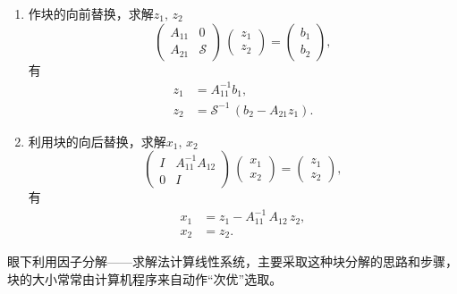 \begin{enumerate}
  \item 作块的向前替换，求解$z_{1}, \, z_{2}$
  \begin{equation*}
    \begin{pmatrix}
    A_{11} & 0 \\
    A_{21} & \mathcal{S}
    \end{pmatrix}
    \,
    \begin{pmatrix}
      z_{1} \\
      z_{2}
    \end{pmatrix}
    =
    \begin{pmatrix}
      b_{1} \\
      b_{2}
    \end{pmatrix},
  \end{equation*}
  有
  \begin{equation*}
    \begin{split}
      z_{1} & = A_{11}^{-1} b_{1}, \\
      z_{2} & = \mathcal{S}^{-1} \, \left( b_{2} - A_{21} z_{1} \right).
    \end{split}
  \end{equation*}
  \item 利用块的向后替换，求解$x_{1}, \, x_{2}$
  \begin{equation*}
    \begin{pmatrix}
      I & A_{11}^{-1} A_{12} \\
      0 & I
    \end{pmatrix}
    \,
    \begin{pmatrix}
      x_{1} \\
      x_{2}
    \end{pmatrix}
    =
    \begin{pmatrix}
      z_{1} \\
      z_{2}
    \end{pmatrix},
  \end{equation*}
有
\begin{equation*}
  \begin{split}
    x_{1} & = z_{1} - A_{11}^{-1} \, A_{12} \, z_{2}, \\
    x_{2} & = z_{2}.
  \end{split}
\end{equation*}
\end{enumerate}

眼下利用因子分解——求解法计算线性系统，主要采取这种块分解的思路和步骤，块的大小常常由计算机程序来自动作``次优”选取。

